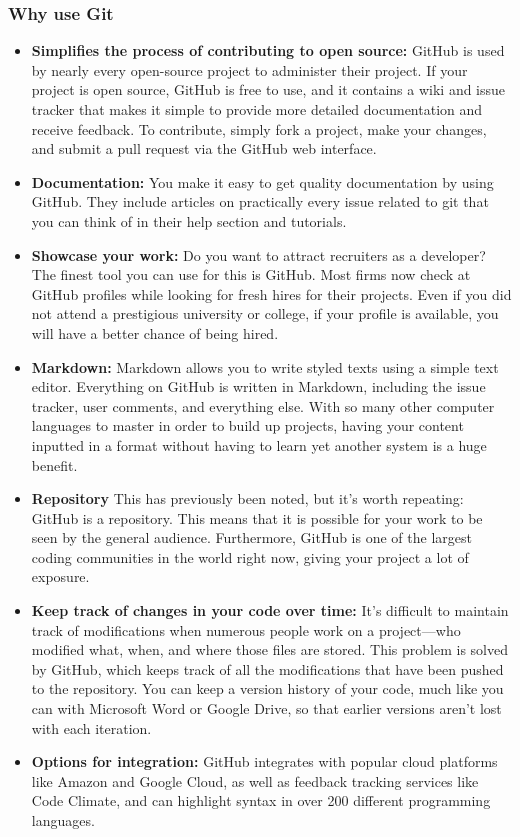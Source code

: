 \subsubsection{Why use Git}
\begin{itemize}
  \item \textbf{Simplifies the process of contributing to open source:} GitHub is used by nearly every open-source project to administer their project. If your project is open source, GitHub is free to use, and it contains a wiki and issue tracker that makes it simple to provide more detailed documentation and receive feedback. To contribute, simply fork a project, make your changes, and submit a pull request via the GitHub web interface.
  \item \textbf{Documentation:} You make it easy to get quality documentation by using GitHub. They include articles on practically every issue related to git that you can think of in their help section and tutorials.
  \item \textbf{Showcase your work:} Do you want to attract recruiters as a developer? The finest tool you can use for this is GitHub. Most firms now check at GitHub profiles while looking for fresh hires for their projects. Even if you did not attend a prestigious university or college, if your profile is available, you will have a better chance of being hired.
  \item \textbf{Markdown:} Markdown allows you to write styled texts using a simple text editor. Everything on GitHub is written in Markdown, including the issue tracker, user comments, and everything else. With so many other computer languages to master in order to build up projects, having your content inputted in a format without having to learn yet another system is a huge benefit.
  \item \textbf{Repository} This has previously been noted, but it's worth repeating: GitHub is a repository. This means that it is possible for your work to be seen by the general audience. Furthermore, GitHub is one of the largest coding communities in the world right now, giving your project a lot of exposure.
  \item \textbf{Keep track of changes in your code over time:} It's difficult to maintain track of modifications when numerous people work on a project—who modified what, when, and where those files are stored. This problem is solved by GitHub, which keeps track of all the modifications that have been pushed to the repository. You can keep a version history of your code, much like you can with Microsoft Word or Google Drive, so that earlier versions aren't lost with each iteration.
  \item \textbf{Options for integration:} GitHub integrates with popular cloud platforms like Amazon and Google Cloud, as well as feedback tracking services like Code Climate, and can highlight syntax in over 200 different programming languages.
\end{itemize}

